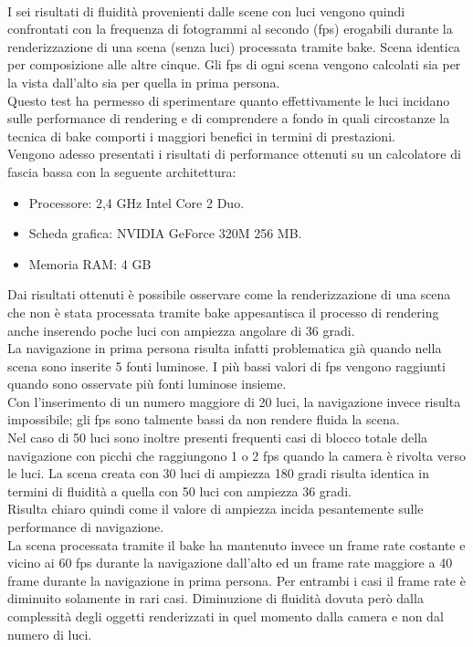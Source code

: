\\
I sei risultati di fluidità provenienti dalle scene con luci vengono quindi confrontati con la frequenza di fotogrammi al secondo (fps) erogabili durante la renderizzazione di una scena (senza luci) processata tramite bake. Scena identica per composizione alle altre cinque.
Gli fps di ogni scena vengono calcolati sia per la vista dall’alto sia per quella in prima persona.
\\
Questo test ha permesso di sperimentare quanto effettivamente le luci incidano sulle performance di rendering e di comprendere a fondo in quali circostanze la tecnica di bake comporti i maggiori benefici in termini di prestazioni.
\\
Vengono adesso presentati i risultati di performance ottenuti su un calcolatore di fascia bassa con la seguente architettura:
\begin{itemize}
\item Processore: 2,4 GHz Intel Core 2 Duo.
\item Scheda grafica: NVIDIA GeForce 320M 256 MB.
\item Memoria RAM: 4 GB
\end{itemize}
Dai risultati ottenuti è possibile osservare come la renderizzazione di una scena che non è stata processata tramite bake appesantisca il processo di rendering anche inserendo poche luci con ampiezza angolare di 36 gradi.
\\
La navigazione in prima persona risulta infatti problematica già quando nella scena sono inserite 5 fonti luminose. I più bassi valori di fps vengono raggiunti quando sono osservate più fonti luminose insieme.
\\
Con l’inserimento di un numero maggiore di 20 luci, la navigazione invece risulta impossibile; gli fps sono talmente bassi da non rendere fluida la scena.
\\
Nel caso di 50 luci sono inoltre presenti frequenti casi di blocco totale della navigazione con picchi che raggiungono 1 o 2 fps quando la camera è rivolta verso le luci.
La scena creata con 30 luci di ampiezza 180 gradi risulta identica in termini di fluidità a quella con 50 luci con ampiezza 36 gradi. 
\\
Risulta chiaro quindi come il valore di ampiezza incida pesantemente sulle performance di navigazione.
\\
La scena processata tramite il bake ha mantenuto invece un frame rate costante e vicino ai 60 fps durante la navigazione dall’alto ed un frame rate maggiore a 40 frame durante la navigazione in prima persona. Per entrambi i casi il frame rate è diminuito solamente in rari casi. Diminuzione di fluidità dovuta però dalla complessità degli oggetti renderizzati in quel momento dalla camera e non dal numero di luci.
